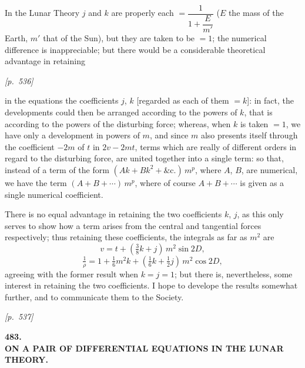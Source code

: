 \documentclass[11pt]{article}
\begin{document}
In the Lunar Theory $j$ and $k$ are properly each $=\dfrac{1}{1+\dfrac{E}{m'}}$
($E$ the mass of the Earth, $m'$ that of the Sun), but they are taken to
be $=1$; the numerical difference is inappreciable; but there would be a
considerable theoretical advantage in retaining


\bigskip
\noindent\textit{[p.~536]}

\medskip

in the equations the coefficients $j$, $k$ [regarded as each of them
$=k$]: in fact, the developments could then be arranged according to the
powers of $k$, that is according to the powers of the disturbing force;
whereas, when $k$ is taken $=1$, we have only a development in powers of
$m$, and since $m$ also presents itself through the coefficient $-2m$ of
$t$ in $2v-2mt$, terms which are really of different orders in regard to
the disturbing force, are united together into a single term: so that,
instead of a term of the form $(Ak+Bk^2+\&\mathrm{c}.)\,m^p$, where $A$,
$B$, are numerical, we have the term $(A+B+\cdots)\,m^p$, where of
course $A+B+\cdots$ is given as a single numerical coefficient.

There is no equal advantage in retaining the two coefficients $k$, $j$,
as this only serves to show how a term arises from the central and
tangential forces respectively; thus retaining these coefficients, the
integrals as far as $m^2$ are
\[
v=t+(\tfrac{3}{8}k+j)\,m^2\sin 2D,
\]
\[
\tfrac{1}{\rho}=1+\tfrac{1}{6}m^2k+(\tfrac{1}{6}k+\tfrac{1}{2}j)\,m^2\cos 2D,
\]
agreeing with the former result when $k=j=1$; but there is, nevertheless,
some interest in retaining the two coefficients. I hope to develope the
results somewhat further, and to communicate them to the Society.


\newpage
\noindent\textit{[p.~537]}

\bigskip

\begin{center}
\textbf{\large 483.}\\[6pt]
\textbf{\Large ON A PAIR OF DIFFERENTIAL EQUATIONS IN THE LUNAR}\\
\textbf{\Large THEORY.}
\end{center}
\end{document}
